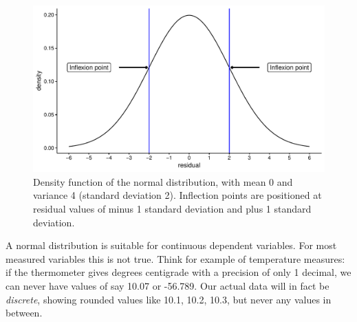 \documentclass[]{book}\usepackage[]{graphicx}\usepackage[]{color}
\makeatletter
\def\maxwidth{ %
  \ifdim\Gin@nat@width>\linewidth
    \linewidth
  \else
    \Gin@nat@width
  \fi
}
\newenvironment{knitrout}{}{} %
\makeatother
\begin{document}
\begin{knitrout}
\color{fgcolor}\begin{figure}

{\centering \includegraphics[width=\maxwidth]{figure/gen_1-1} 

}

\caption[Density function of the normal distribution, with mean 0 and variance 4 (standard deviation 2)]{Density function of the normal distribution, with mean 0 and variance 4 (standard deviation 2). Inflection points are positioned at residual values of minus 1 standard deviation and plus 1 standard deviation.}\label{fig:gen_1}
\end{figure}


\end{knitrout}
% 
A normal distribution is suitable for continuous dependent variables. For most measured variables this is not true. Think for example of temperature measures: if the thermometer gives degrees centigrade with a precision of only 1 decimal, we can never have values of say 10.07 or -56.789. Our actual data will in fact be \textit{discrete}, showing rounded values like 10.1, 10.2, 10.3, but never any values in between.
\end{document}
